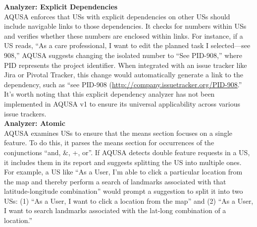 \textbf{Analyzer: Explicit Dependencies}\\ 
AQUSA enforces that USs with explicit dependencies on other USs should include navigable links to those dependencies. It checks for numbers within USs and verifies whether these numbers are enclosed within links. For instance, if a US reads, \enquote{As a care professional, I want to edit the planned task I selected—see 908,} AQUSA suggests changing the isolated number to \enquote{See PID-908,} where PID represents the project identifier. When integrated with an issue tracker like Jira or Pivotal Tracker, this change would automatically generate a link to the dependency, such as \enquote{see PID-908 (\href{http://company.issuetracker.org/PID-908)}{http://company.issuetracker.org/PID-908}.} It's worth noting that this explicit dependency analyzer has not been implemented in AQUSA v1 to ensure its universal applicability across various issue trackers.\\ 
\textbf{Analyzer: Atomic}\\ 
AQUSA examines USs to ensure that the means section focuses on a single feature. To do this, it parses the means section for occurrences of the conjunctions \enquote{and, \&, +, or}. If AQUSA detects double feature requests in a US, it includes them in its report and suggests splitting the US into multiple ones. 
For example, a US like \enquote{As a User, I’m able to click a particular location from the map and thereby perform a search of landmarks associated with that latitude-longitude combination} would prompt a suggestion to split it into two USs: (1) \enquote{As a User, I want to click a location from the map} and (2) \enquote{As a User, I want to search landmarks associated with the lat-long combination of a location.}

